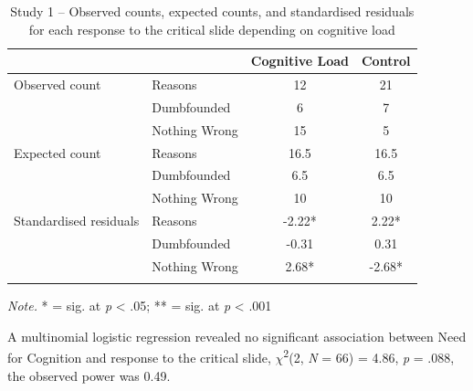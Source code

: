 \documentclass[
  american,
  man,floatsintext]{apa7}
\begin{document}
\begin{table}[tbp]

\begin{center}
\begin{threeparttable}

\caption{\label{tab:S1tab1dumb}Study 1 – Observed counts, expected counts, and standardised residuals for each response to the critical slide depending on cognitive load}

\begin{tabular}{llcc}
\toprule
 & \multicolumn{1}{c}{} & \multicolumn{1}{c}{Cognitive Load} & \multicolumn{1}{c}{Control}\\
\midrule
Observed count & Reasons & 12 & 21\\
 & Dumbfounded & 6 & 7\\
 & Nothing Wrong & 15 & 5\\
Expected count & Reasons & 16.5 & 16.5\\
 & Dumbfounded & 6.5 & 6.5\\
 & Nothing Wrong & 10 & 10\\
Standardised residuals & Reasons & -2.22* & 2.22*\\
 & Dumbfounded & -0.31 & 0.31\\
 & Nothing Wrong & 2.68* & -2.68*\\
\bottomrule
\addlinespace
\end{tabular}

\begin{tablenotes}[para]
\normalsize{\textit{Note.} * = sig. at \emph{p} < .05; ** = sig. at \emph{p} < .001}
\end{tablenotes}

\end{threeparttable}
\end{center}

\end{table}

A multinomial logistic regression revealed no significant association between Need for Cognition and response to the critical slide, \(\chi\)\textsuperscript{2}(2, \emph{N} = 66) = 4.86, \emph{p} = .088, the observed power was 0.49.
\end{document}
